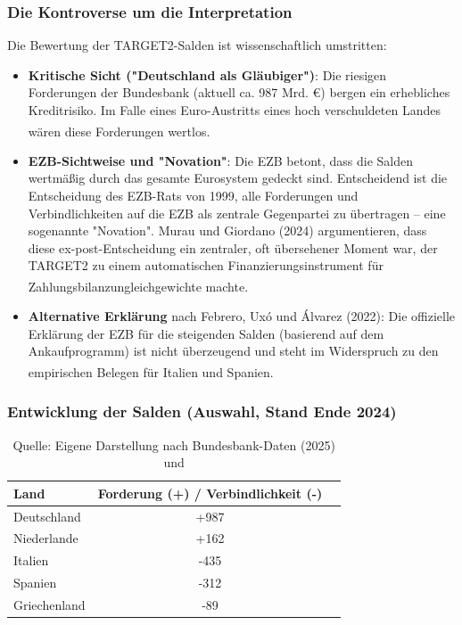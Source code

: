 \documentclass[12pt,a4paper]{article}
\newcommand{\footcite}[1]{\textsuperscript{\cite{#1}}}
\begin{document}
	\subsubsection{Die Kontroverse um die Interpretation}
	
	Die Bewertung der TARGET2-Salden ist wissenschaftlich umstritten:
	
	\begin{itemize}
		\item \textbf{Kritische Sicht ("Deutschland als Gläubiger")}: Die riesigen Forderungen der Bundesbank (aktuell ca. 987 Mrd. €) bergen ein erhebliches Kreditrisiko. Im Falle eines Euro-Austritts eines hoch verschuldeten Landes wären diese Forderungen wertlos.\footcite{Schularick2019}
		\item \textbf{EZB-Sichtweise und "Novation"}: Die EZB betont, dass die Salden wertmäßig durch das gesamte Eurosystem gedeckt sind. Entscheidend ist die Entscheidung des EZB-Rats von 1999, alle Forderungen und Verbindlichkeiten auf die EZB als zentrale Gegenpartei zu übertragen – eine sogenannte "Novation". Murau und Giordano (2024) argumentieren, dass diese ex-post-Entscheidung ein zentraler, oft übersehener Moment war, der TARGET2 zu einem automatischen Finanzierungsinstrument für Zahlungsbilanzungleichgewichte machte.\footcite{Murau2024}
		\item \textbf{Alternative Erklärung} nach Febrero, Uxó und Álvarez (2022): Die offizielle Erklärung der EZB für die steigenden Salden (basierend auf dem Ankaufprogramm) ist nicht überzeugend und steht im Widerspruch zu den empirischen Belegen für Italien und Spanien.\footcite{Febrero2022}
	\end{itemize}
	
	\subsubsection{Entwicklung der Salden (Auswahl, Stand Ende 2024)}
	
	\begin{table}[H]
		\centering
		\caption{TARGET2-Salden ausgewählter Länder (in Mrd. €)}
		\label{tab:target2}
		\begin{tabular}{lcc}
			\toprule
			Land & Forderung (+) / Verbindlichkeit (-) \\
			\midrule
			Deutschland & +987 \\
			Niederlande & +162 \\
			Italien & -435 \\
			Spanien & -312 \\
			Griechenland & -89 \\
			\bottomrule
		\end{tabular}
		\caption*{Quelle: Eigene Darstellung nach Bundesbank-Daten (2025) und \cite{Natixis2025}}
	\end{table}
	
\end{document}
